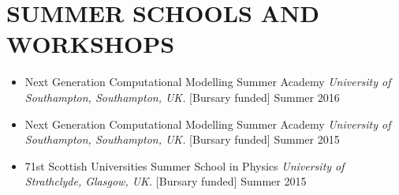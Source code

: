 \section{\textbf{\color{RoyalBlue}SUMMER SCHOOLS AND WORKSHOPS}}
\begin{itemize}
\item Next Generation Computational Modelling Summer Academy {\sl University of Southampton, Southampton, UK.} [Bursary funded] \hfill Summer 2016 \\
\item Next Generation Computational Modelling Summer Academy {\sl University of Southampton, Southampton, UK.} [Bursary funded] \hfill Summer 2015 \\
\item 71st Scottish Universities Summer School in Physics {\sl University of Strathclyde, Glasgow, UK.}  [Bursary funded] \hfill Summer 2015 
\end{itemize}